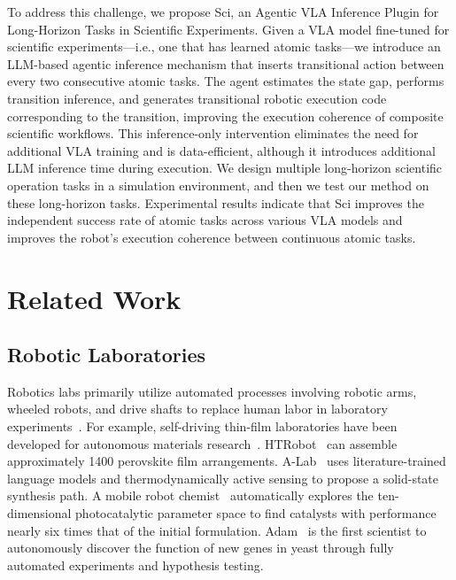 \documentclass[letterpaper]{article} %
\begin{document}
To address this challenge, we propose Sci, an Agentic VLA Inference Plugin for Long-Horizon Tasks in Scientific Experiments.
Given a VLA model fine-tuned for scientific experiments—i.e., one that has learned atomic tasks—we introduce an LLM-based agentic inference mechanism that inserts transitional action between every two consecutive atomic tasks.
The agent estimates the state gap, performs transition inference, and generates transitional robotic execution code corresponding to the transition, improving the execution coherence of composite scientific workflows.
This inference-only intervention eliminates the need for additional VLA training and is data-efficient, although it introduces additional LLM inference time during execution.
We design multiple long-horizon scientific operation tasks in a simulation environment, and then we test our method on these long-horizon tasks. Experimental results indicate that Sci improves the independent success rate of atomic tasks across various VLA models and improves the robot's execution coherence between continuous atomic tasks.



\section{Related Work}
\subsection{Robotic Laboratories}

Robotics labs primarily utilize automated processes involving robotic arms, wheeled robots, and drive shafts to replace human labor in laboratory experiments~\cite{boyd2002robotic}.
For example, self-driving thin-film laboratories have been developed for autonomous materials research~\cite{macleod2020self}. HTRobot~\cite{zhao2021discovery} can assemble approximately 1400 perovskite film arrangements.
A-Lab~\cite{szymanski2023autonomous} uses literature-trained language models and thermodynamically active sensing to propose a solid-state synthesis path.
A mobile robot
chemist~\cite{burger2020mobile} automatically explores the ten-dimensional photocatalytic parameter space to find catalysts with performance nearly six times that of the initial formulation.
Adam~\cite{king2009automation} is the first scientist to autonomously discover the function of new genes in yeast through fully automated experiments and hypothesis testing.
\end{document}
